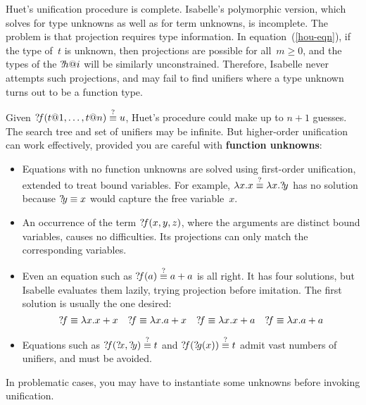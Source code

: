\begin{warn}%
Huet's unification procedure is complete.  Isabelle's polymorphic version,
which solves for type unknowns as well as for term unknowns, is incomplete.
The problem is that projection requires type information.  In
equation~(\ref{hou-eqn}), if the type of~$t$ is unknown, then projections
are possible for all~$m\geq0$, and the types of the ${?\!h@i}$ will be
similarly unconstrained.  Therefore, Isabelle never attempts such
projections, and may fail to find unifiers where a type unknown turns out
to be a function type.
\end{warn}

Given ${?\!f}(t@1,\ldots,t@n)\stackrel{?}{\equiv} u$, Huet's procedure could make up to
$n+1$ guesses.  The search tree and set of unifiers may be infinite.  But
higher-order unification can work effectively, provided you are careful
with {\bf function unknowns}:
\begin{itemize}
  \item Equations with no function unknowns are solved using first-order
unification, extended to treat bound variables.  For example, $\lambda x.x
\stackrel{?}{\equiv} \lambda x.{?\!y}$ has no solution because ${?\!y}\equiv x$ would
capture the free variable~$x$.

  \item An occurrence of the term ${?\!f}(x,y,z)$, where the arguments are
distinct bound variables, causes no difficulties.  Its projections can only
match the corresponding variables.

  \item Even an equation such as ${?\!f}(a)\stackrel{?}{\equiv} a+a$ is all right.  It has
four solutions, but Isabelle evaluates them lazily, trying projection before
imitation.  The first solution is usually the one desired:
\[ {?\!f}\equiv \lambda x. x+x \quad
   {?\!f}\equiv \lambda x. a+x \quad
   {?\!f}\equiv \lambda x. x+a \quad
   {?\!f}\equiv \lambda x. a+a \]
  \item  Equations such as ${?\!f}({?\!x},{?\!y})\stackrel{?}{\equiv} t$ and
${?\!f}({?\!g}(x))\stackrel{?}{\equiv} t$ admit vast numbers of unifiers, and must be
avoided. 
\end{itemize}
In problematic cases, you may have to instantiate some unknowns before
invoking unification. 


